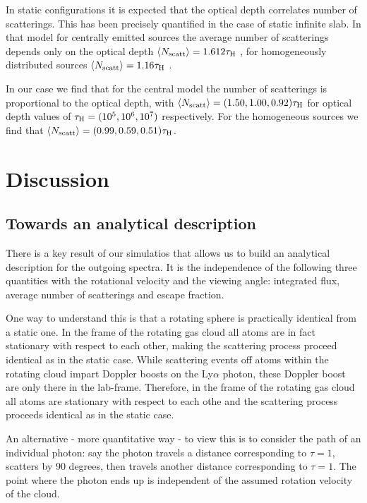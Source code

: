 \documentclass{emulateapj}
\begin{document}
In static configurations it is expected that the optical depth correlates number of
scatterings.  
This has been precisely quantified in the case of static infinite
slab. 
In that model for centrally emitted sources the average number of
scatterings depends only on the optical depth $\langle N_{\rm
  scatt}\rangle=1.612\tau_{\rm   H}$ \citep{Adams72,Harrington73}, for
homogeneously distributed sources $\langle N_{\rm
  scatt}\rangle=1.16\tau_{\rm   H}$ \citep{Harrington73}.

In our case we find that for the central model the number of
scatterings is proportional to the optical depth, with $\langle N_{\rm
  scatt}\rangle= (1.50, 1.00, 0.92)\tau_{\rm   H}$ for optical depth
values of $\tau_{\rm H} = (10^{5}, 10^{6}, 10^{7})$ respectively.
For the homogeneous sources we find that $\langle N_{\rm
  scatt}\rangle= (0.99, 0.59, 0.51)\tau_{\rm   H}$.





\section{Discussion}
\label{sec:discussion}

\subsection{Towards an analytical description}

There is a key result of our simulatios that allows us to build an
analytical description for the outgoing spectra.
It is the independence of the following three quantities with the rotational
velocity and the viewing angle: integrated flux, average number of
scatterings and escape fraction.


One way to understand this is that a rotating sphere
is practically identical from a static one. 
In the frame of the rotating gas cloud all atoms are in fact
stationary with respect to each other, making the scattering process
proceed identical as in the static case.  
While scattering events off atoms within the rotating cloud impart
Doppler boosts on the Ly$\alpha$ photon, these Doppler boost are only
there in the lab-frame.  
Therefore, in the frame of the rotating gas cloud all atoms are
stationary with respect to each othe and the scattering process
proceeds identical as in the static case.  

An alternative - more quantitative way - to view this is   to consider
the path of an individual photon: say the photon travels  a distance
corresponding to $\tau=1$, scatters by $90$ degrees, then travels
another distance corresponding to $\tau=1$. 
The point where the photon ends up is independent of the assumed
rotation velocity of the cloud. 
\end{document}
